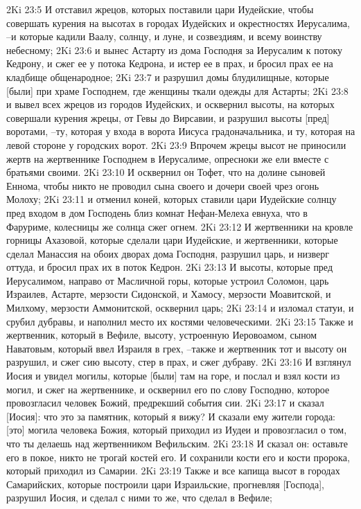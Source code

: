 2Ki 23:5  И отставил жрецов, которых поставили цари Иудейские, чтобы совершать курения на высотах в городах Иудейских и окрестностях Иерусалима, --и которые кадили Ваалу, солнцу, и луне, и созвездиям, и всему воинству небесному;
2Ki 23:6  и вынес Астарту из дома Господня за Иерусалим к потоку Кедрону, и сжег ее у потока Кедрона, и истер ее в прах, и бросил прах ее на кладбище общенародное;
2Ki 23:7  и разрушил домы блудилищные, которые [были] при храме Господнем, где женщины ткали одежды для Астарты;
2Ki 23:8  и вывел всех жрецов из городов Иудейских, и осквернил высоты, на которых совершали курения жрецы, от Гевы до Вирсавии, и разрушил высоты [пред] воротами, --ту, которая у входа в ворота Иисуса градоначальника, и ту, которая на левой стороне у городских ворот.
2Ki 23:9  Впрочем жрецы высот не приносили жертв на жертвеннике Господнем в Иерусалиме, опресноки же ели вместе с братьями своими.
2Ki 23:10  И осквернил он Тофет, что на долине сыновей Еннома, чтобы никто не проводил сына своего и дочери своей чрез огонь Молоху;
2Ki 23:11  и отменил коней, которых ставили цари Иудейские солнцу пред входом в дом Господень близ комнат Нефан-Мелеха евнуха, что в Фаруриме, колесницы же солнца сжег огнем.
2Ki 23:12  И жертвенники на кровле горницы Ахазовой, которые сделали цари Иудейские, и жертвенники, которые сделал Манассия на обоих дворах дома Господня, разрушил царь, и низверг оттуда, и бросил прах их в поток Кедрон.
2Ki 23:13  И высоты, которые пред Иерусалимом, направо от Масличной горы, которые устроил Соломон, царь Израилев, Астарте, мерзости Сидонской, и Хамосу, мерзости Моавитской, и Милхому, мерзости Аммонитской, осквернил царь;
2Ki 23:14  и изломал статуи, и срубил дубравы, и наполнил место их костями человеческими.
2Ki 23:15  Также и жертвенник, который в Вефиле, высоту, устроенную Иеровоамом, сыном Наватовым, который ввел Израиля в грех, --также и жертвенник тот и высоту он разрушил, и сжег сию высоту, стер в прах, и сжег дубраву.
2Ki 23:16  И взглянул Иосия и увидел могилы, которые [были] там на горе, и послал и взял кости из могил, и сжег на жертвеннике, и осквернил его по слову Господню, которое провозгласил человек Божий, предрекший события сии.
2Ki 23:17  и сказал [Иосия]: что это за памятник, который я вижу? И сказали ему жители города: [это] могила человека Божия, который приходил из Иудеи и провозгласил о том, что ты делаешь над жертвенником Вефильским.
2Ki 23:18  И сказал он: оставьте его в покое, никто не трогай костей его. И сохранили кости его и кости пророка, который приходил из Самарии.
2Ki 23:19  Также и все капища высот в городах Самарийских, которые построили цари Израильские, прогневляя [Господа], разрушил Иосия, и сделал с ними то же, что сделал в Вефиле;
